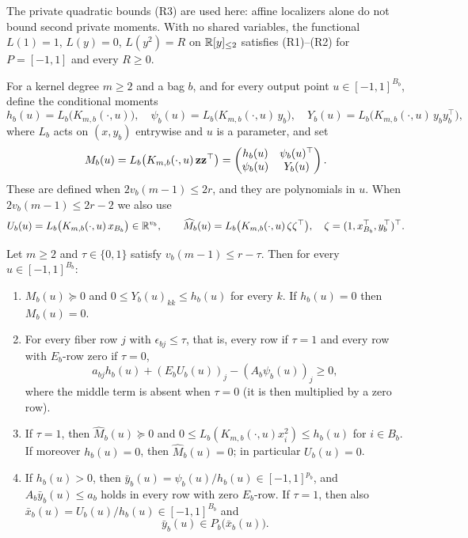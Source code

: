 The private quadratic bounds (R3) are used here: affine localizers alone
do not bound second private moments. With no shared variables, the
functional $L(1)=1$, $L(y)=0$, $L(y^2)=R$ on $\mathbb{R}[y]_{\le 2}$ satisfies
(R1)--(R2) for $P=[-1,1]$ and every $R\ge0$.

For a kernel degree $m\ge2$ and a bag $b$, and for every output point
$u\in[-1,1]^{B_b}$, define the conditional moments
\begin{equation}\label{eq:rec-conditional}
  h_b(u)=L_b\bigl(K_{m,b}(\cdot,u)\bigr),\quad
  \psi_b(u)=L_b\bigl(K_{m,b}(\cdot,u)\,y_b\bigr),\quad
  Y_b(u)=L_b\bigl(K_{m,b}(\cdot,u)\,y_by_b^\top\bigr),
\end{equation}
where $L_b$ acts on $(x,y_b)$ entrywise and $u$ is a parameter, and set
\[
  M_b(u)=L_b\bigl(K_{m,b}(\cdot,u)\,\mathbf{z}\mathbf{z}^\top\bigr)
  =\begin{pmatrix}h_b(u)&\psi_b(u)^\top\\ \psi_b(u)&Y_b(u)\end{pmatrix}.
\]
These are defined when $2v_b(m-1)\le2r$, and they are polynomials in $u$.
When $2v_b(m-1)\le2r-2$ we also use
\[
  U_b(u)=L_b\bigl(K_{m,b}(\cdot,u)\,x_{B_b}\bigr)\in\mathbb{R}^{v_b},\qquad
  \widehat M_b(u)=L_b\bigl(K_{m,b}(\cdot,u)\,\zeta\zeta^\top\bigr),\quad
  \zeta=(1,x_{B_b}^\top,y_b^\top)^\top .
\]

\begin{lemma}\label{lem:conditional-matrix}
Let $m\ge2$ and $\tau\in\{0,1\}$ satisfy $v_b(m-1)\le r-\tau$. Then for every
$u\in[-1,1]^{B_b}$:
\begin{enumerate}[label=(\alph*)]
\item $M_b(u)\succeq0$ and $0\le Y_b(u)_{kk}\le h_b(u)$ for every $k$. If
  $h_b(u)=0$ then $M_b(u)=0$.
\item For every fiber row $j$ with $\epsilon_{bj}\le\tau$, that is, every
  row if $\tau=1$ and every row with $E_b$-row zero if $\tau=0$,
  \[
    a_{bj}h_b(u)+(E_bU_b(u))_j-(A_b\psi_b(u))_j\ge0,
  \]
  where the middle term is absent when $\tau=0$ (it is then multiplied by
  a zero row).
\item If $\tau=1$, then $\widehat M_b(u)\succeq0$ and
  $0\le L_b(K_{m,b}(\cdot,u)x_i^2)\le h_b(u)$ for $i\in B_b$. If moreover
  $h_b(u)=0$, then $\widehat M_b(u)=0$; in particular $U_b(u)=0$.
\item If $h_b(u)>0$, then $\bar y_b(u)=\psi_b(u)/h_b(u)\in[-1,1]^{p_b}$, and
  $A_b\bar y_b(u)\le a_b$ holds in every row with zero $E_b$-row. If
  $\tau=1$, then also $\bar x_b(u)=U_b(u)/h_b(u)\in[-1,1]^{B_b}$ and
  \begin{equation}\label{eq:rec-source-feasible}
    \bar y_b(u)\in P_b\bigl(\bar x_b(u)\bigr).
  \end{equation}
\end{enumerate}
\end{lemma}

